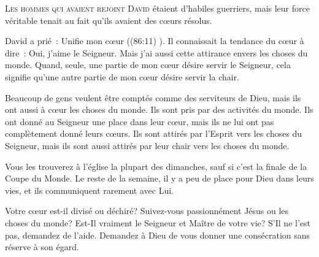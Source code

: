 


\lettrine{L}{es hommes qui avaient rejoint David}
 étaient d'habiles guerriers, mais leur force véritable
 tenait au fait qu'ils avaient des c\oe{}urs résolus. 

David a prié~:
 \og Unifie mon c\oe{}ur \fg{} ((86:11) \NBS).
 Il connaissait la tendance du c\oe{}ur à dire~:
 \og Oui, j'aime le Seigneur. Mais j'ai aussi cette attirance
 envers les choses du monde. \fg{}
 Quand, seule, une partie de mon c\oe{}ur désire servir le Seigneur,
 cela signifie qu'une autre partie de mon c\oe{}ur désire servir la chair. 


Beaucoup de gens veulent être comptés comme des serviteurs de Dieu,
 mais ils ont aussi à c\oe{}ur les choses du monde.
 Ils sont pris par des activités du monde.
 Ils ont donné au Seigneur une place dans leur c\oe{}ur,
 mais ils ne lui ont pas complètement donné leurs c\oe{}urs.
 Ils sont attirés par l'Esprit vers les choses du Seigneur,
 mais ils sont aussi attirés par leur chair vers les choses du monde. 

Vous les trouverez à l'église la plupart des dimanches,
 sauf si c'est la finale de la Coupe du Monde. Le reste de la semaine,
 il y a peu de place pour Dieu dans leurs vies,
 et ils communiquent rarement avec Lui. 

Votre c\oe{}ur est-il divisé ou déchiré?
 Suivez-vous passionnément Jésus ou les choses du monde?
 Est-Il vraiment le Seigneur et Maître de votre vie?
 S'Il ne l'est pas, demandez de l'aide. Demandez à Dieu de vous donner
 une consécration sans réserve à son égard. 

\dvrule






